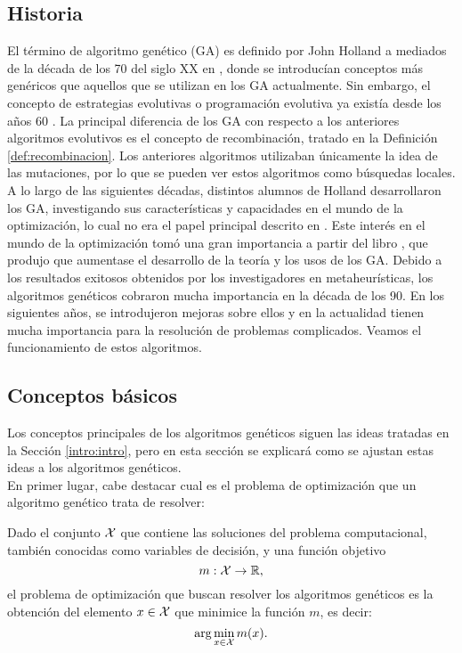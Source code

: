 \subsection{Historia}
El término de algoritmo genético (GA) es definido por John Holland a mediados de la década de los 70 del siglo XX en \cite{holland_ga}, donde se introducían conceptos más genéricos que aquellos que se utilizan en los GA actualmente. Sin embargo, el concepto de estrategias evolutivas o programación evolutiva ya existía desde los años 60 \cite{rechenberg-1973,evolutionary-programming}. La principal diferencia de los GA con respecto a los anteriores algoritmos evolutivos es el concepto de recombinación, tratado en la Definición \ref{def:recombinacion}. Los anteriores algoritmos utilizaban únicamente la idea de las mutaciones, por lo que se pueden ver estos algoritmos como búsquedas locales.\\

A lo largo de las siguientes décadas, distintos alumnos de Holland desarrollaron los GA, investigando sus características y capacidades en el mundo de la optimización, lo cual no era el papel principal descrito en \cite{holland_ga}. Este interés en el mundo de la optimización tomó una gran importancia a partir del libro \cite{goldberg-ga}, que produjo que aumentase el desarrollo de la teoría y los usos de los GA. Debido a los resultados exitosos obtenidos por los investigadores en metaheurísticas, los algoritmos genéticos cobraron mucha importancia en la década de los 90. En los siguientes años, se introdujeron mejoras sobre ellos y en la actualidad tienen mucha importancia para la resolución de problemas complicados. Veamos el funcionamiento de estos algoritmos.\\

\subsection{Conceptos básicos}
Los conceptos principales de los algoritmos genéticos siguen las ideas tratadas en la Sección \ref{intro:intro}, pero en esta sección se explicará como se ajustan estas ideas a los algoritmos genéticos.\\

En primer lugar, cabe destacar cual es el problema de optimización que un algoritmo genético trata de resolver:

\begin{definition}
    Dado el conjunto $\mathcal{X}$ que contiene las soluciones del problema computacional, también conocidas como variables de decisión, y una función objetivo
    $$m:\mathcal{X}\rightarrow\mathbb{R},$$
    el problema de optimización que buscan resolver los algoritmos genéticos es la obtención del elemento $x\in\mathcal{X}$ que minimice la función $m$, es decir:
    \begin{equation}\label{eq:def_min}
        \arg\min_{x\in\mathcal{X}}m(x).
    \end{equation}
\end{definition}

